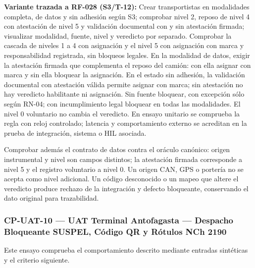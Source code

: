 \par\noindent\textbf{Variante trazada a RF-028 (S3/T-12):} Crear transportistas en modalidades completa, de datos y sin adhesión según S3; comprobar nivel 2, reposo de nivel 4 con atestación de nivel 5 y validación documental con y sin atestación firmada; visualizar modalidad, fuente, nivel y veredicto por separado. Comprobar la cascada de niveles 1 a 4 con asignación y el nivel 5 con asignación con marca y responsabilidad registrada, sin bloqueos legales. En la modalidad de datos, exigir la atestación firmada que complementa el reposo del camión: con ella asignar con marca y sin ella bloquear la asignación. En el estado sin adhesión, la validación documental con atestación válida permite asignar con marca; sin atestación no hay veredicto habilitante ni asignación. Sin fuente bloquear, con excepción sólo según RN-04; con incumplimiento legal bloquear en todas las modalidades. El nivel 0 voluntario no cambia el veredicto. En ensayo unitario se comprueba la regla con reloj controlado; latencia y comportamiento externo se acreditan en la prueba de integración, sistema o HIL asociada.\par

\par\noindent Comprobar además el contrato de datos contra el oráculo canónico: origen instrumental y nivel son campos distintos; la atestación firmada corresponde a nivel 5 y el registro voluntario a nivel 0. Un origen CAN, GPS o portería no se acepta como nivel adicional. Un código desconocido o un mapeo que altere el veredicto produce rechazo de la integración y defecto bloqueante, conservando el dato original para trazabilidad.\par


\subsubsection*{CP-UAT-10 — UAT Terminal Antofagasta — Despacho Bloqueante SUSPEL, Código QR y Rótulos NCh 2190}\label{sec:9-cp-uat-10}
Este ensayo comprueba el comportamiento descrito mediante entradas sintéticas y el criterio siguiente.

